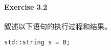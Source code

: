 \documentclass{article}
\begin{document}
	\paragraph*{Exercise 3.2} 叙述以下语句的执行过程和结果。
	
	\verb|std::string s = 0;|
	
\end{document}
